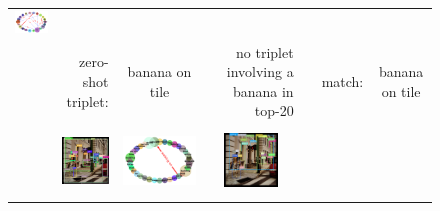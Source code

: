 \begin{figure}
\begin{tabular}{p{0.3cm}|rc|p{0.1cm}rc|p{0.1cm}rc}
		\includegraphics[width=\figwidthvis, align=c]{2317051_ours_zs_graph_ours.png} \Tstrutmore\Bstrut\\
		& zero-shot triplet: & {banana on tile} & & \multicolumn{2}{r|}{no triplet involving a banana in top-20} & & match: & {banana on tile} \Bstrut\\
		\cline{2-9} 
		& \includegraphics[width=\figwidthvis, height=1.8cm, align=c]{2320180_ours_zs.png} &
		\includegraphics[width=\figwidthvis, align=c]{2320180_ours_zs_graph_gt.png} & & \includegraphics[width=\figwidthvis, height=1.8cm, align=c]{2320180_ours_zs_baseline.png} &

\end{tabular}
\end{figure}
